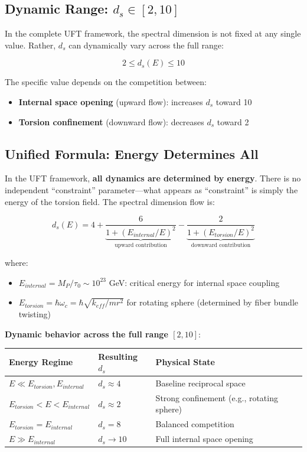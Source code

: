 \documentclass[12pt,a4paper]{article}
\begin{document}
\subsection{Dynamic Range: $d_s \in [2, 10]$}

In the complete UFT framework, the spectral dimension is not fixed at any single value. Rather, $d_s$ can dynamically vary across the full range:

\begin{equation}
    \boxed{2 \leq d_s(E) \leq 10}
\end{equation}

The specific value depends on the competition between:
\begin{itemize}
    \item \textbf{Internal space opening} (upward flow): increases $d_s$ toward 10
    \item \textbf{Torsion confinement} (downward flow): decreases $d_s$ toward 2
\end{itemize}

\subsection{Unified Formula: Energy Determines All}

In the UFT framework, \textbf{all dynamics are determined by energy}. There is no independent ``constraint'' parameter---what appears as ``constraint'' is simply the energy of the torsion field. The spectral dimension flow is:

\begin{equation}
    d_s(E) = 4 + \underbrace{\frac{6}{1+(E_{internal}/E)^2}}_{\text{upward contribution}} - \underbrace{\frac{2}{1+(E_{torsion}/E)^2}}_{\text{downward contribution}}
\end{equation}

where:
\begin{itemize}
    \item $E_{internal} = M_P/\tau_0 \sim 10^{23}$ GeV: critical energy for internal space coupling
    \item $E_{torsion} = \hbar\omega_c = \hbar\sqrt{k_{eff}/mr^2}$ for rotating sphere (determined by fiber bundle twisting)
\end{itemize}

\textbf{Dynamic behavior across the full range $[2, 10]$}:

\begin{center}
\begin{tabular}{p{3.5cm}p{3cm}p{4cm}}
\toprule
\textbf{Energy Regime} & \textbf{Resulting $d_s$} & \textbf{Physical State} \\
\midrule
$E \ll E_{torsion}, E_{internal}$ & $d_s \approx 4$ & Baseline reciprocal space \\
$E_{torsion} < E < E_{internal}$ & $d_s \approx 2$ & Strong confinement (e.g., rotating sphere) \\
$E_{torsion} = E_{internal}$ & $d_s = 8$ & Balanced competition \\
$E \gg E_{internal}$ & $d_s \to 10$ & Full internal space opening \\
\bottomrule
\end{tabular}
\end{center}
\end{document}
